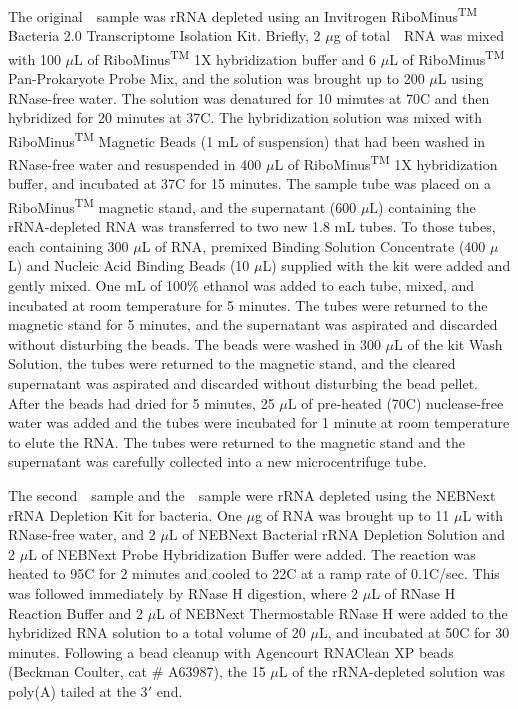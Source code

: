 The original~\syn~sample was rRNA depleted using an Invitrogen RiboMinus\textsuperscript{TM} Bacteria 2.0 Transcriptome Isolation Kit.
Briefly, 2 $\mu$g of total~\syn~RNA was mixed with 100 $\mu$L of RiboMinus\textsuperscript{TM} 1X hybridization buffer and 6 $\mu$L of RiboMinus\textsuperscript{TM} Pan-Prokaryote Probe Mix, and the solution was brought up to 200 $\mu$L using RNase-free water.
The solution was denatured for 10 minutes at 70\textdegree C and then hybridized for 20 minutes at 37\textdegree C.
The hybridization solution was mixed with RiboMinus\textsuperscript{TM} Magnetic Beads (1 mL of suspension) that had been washed in RNase-free water and resuspended in 400 $\mu$L of RiboMinus\textsuperscript{TM} 1X hybridization buffer, and incubated at 37\textdegree C for 15 minutes.
The sample tube was placed on a RiboMinus\textsuperscript{TM} magnetic stand, and the supernatant (600 $\mu$L) containing the rRNA-depleted RNA was transferred to two new 1.8 mL tubes.
To those tubes, each containing 300 $\mu$L of RNA, premixed Binding Solution Concentrate (400 $\mu$L) and Nucleic Acid Binding Beads (10 $\mu$L) supplied with the kit were added and gently mixed.
One mL of 100\% ethanol was added to each tube, mixed, and incubated at room temperature for 5 minutes.
The tubes were returned to the magnetic stand for 5 minutes, and the supernatant was aspirated and discarded without disturbing the beads.
The beads were washed in 300 $\mu$L of the kit Wash Solution, the tubes were returned to the magnetic stand, and the cleared supernatant was aspirated and discarded without disturbing the bead pellet.
After the beads had dried for 5 minutes, 25 $\mu$L of pre-heated (70\textdegree C) nuclease-free water was added and the tubes were incubated for 1 minute at room temperature to elute the RNA.
The tubes were returned to the magnetic stand and the supernatant was carefully collected into a new microcentrifuge tube.

The second~\syn~sample and the~\syna~sample were rRNA depleted using the NEBNext\textregistered{} rRNA Depletion Kit for bacteria.
One $\mu$g of RNA was brought up to 11 $\mu$L with RNase-free water, and 2 $\mu$L of NEBNext\textregistered{} Bacterial rRNA Depletion Solution and 2 $\mu$L of NEBNext\textregistered{} Probe Hybridization Buffer were added.
The reaction was heated to 95\textdegree C for 2 minutes and cooled to 22\textdegree C at a ramp rate of 0.1\textdegree C/sec.
This was followed immediately by RNase H digestion, where 2 $\mu$L of RNase H Reaction Buffer and 2 $\mu$L of NEBNext Thermostable RNase H were added to the hybridized RNA solution to a total volume of 20 $\mu$L, and incubated at 50\textdegree C for 30 minutes.
Following a bead cleanup with Agencourt RNAClean XP beads (Beckman Coulter\texttrademark, cat \# A63987), the 15 $\mu$L of the rRNA-depleted solution was poly(A) tailed at the 3$'$ end.

